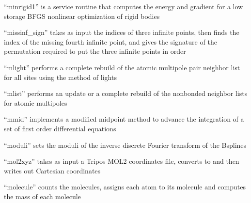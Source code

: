 \documentclass[letterpaper,11pt,english]{sphinxmanual}
\begin{document}
\sphinxAtStartPar
“minrigid1” is a service routine that computes the energy and gradient for a low storage BFGS nonlinear optimization of rigid bodies

\sphinxAtStartPar
{}

\sphinxAtStartPar
“missinf\_sign” takes as input the indices of three infinite points, then finds the index of the missing fourth infinite point, and gives the signature of the permutation required to put the three infinite points in order

\sphinxAtStartPar
{}

\sphinxAtStartPar
“mlight” performs a complete rebuild of the atomic multipole pair neighbor list for all sites using the method of lights

\sphinxAtStartPar
{}

\sphinxAtStartPar
“mlist” performs an update or a complete rebuild of the nonbonded neighbor lists for atomic multipoles

\sphinxAtStartPar
{}

\sphinxAtStartPar
“mmid” implements a modified midpoint method to advance the integration of a set of first order differential equations

\sphinxAtStartPar
{}

\sphinxAtStartPar
{}

\sphinxAtStartPar
{}

\sphinxAtStartPar
{}

\sphinxAtStartPar
{}

\sphinxAtStartPar
{}

\sphinxAtStartPar
“moduli” sets the moduli of the inverse discrete Fourier transform of the B\sphinxhyphen{}splines

\sphinxAtStartPar
{}

\sphinxAtStartPar
“mol2xyz” takes as input a Tripos MOL2 coordinates file, converts to and then writes out Cartesian coordinates

\sphinxAtStartPar
{}

\sphinxAtStartPar
“molecule” counts the molecules, assigns each atom to its molecule and computes the mass of each molecule
\end{document}
